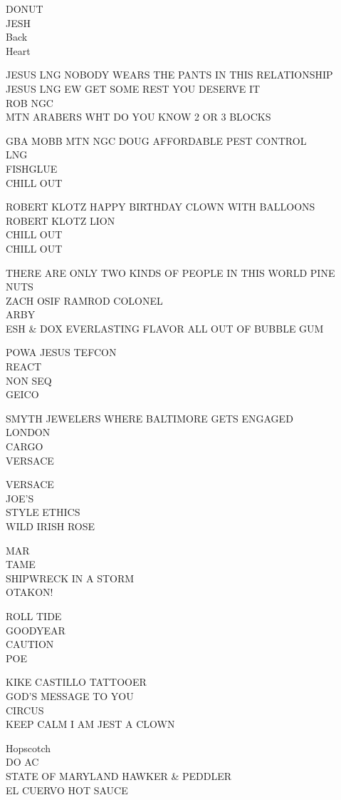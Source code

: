 \documentclass[10pt,letterpaper]{article}
\begin{document}
DONUT\\
JESH\\
Back\\
Heart

JESUS LNG NOBODY WEARS THE PANTS IN THIS RELATIONSHIP\\
JESUS LNG EW GET SOME REST YOU DESERVE IT\\
ROB NGC\\
MTN ARABERS WHT DO YOU KNOW 2 OR 3 BLOCKS

GBA MOBB MTN NGC DOUG AFFORDABLE PEST CONTROL\\
LNG\\
FISHGLUE\\
CHILL OUT

ROBERT KLOTZ HAPPY BIRTHDAY CLOWN WITH BALLOONS\\
ROBERT KLOTZ LION\\
CHILL OUT\\
CHILL OUT

THERE ARE ONLY TWO KINDS OF PEOPLE IN THIS WORLD PINE NUTS\\
ZACH OSIF RAMROD COLONEL\\
ARBY\\
ESH \& DOX EVERLASTING FLAVOR ALL OUT OF BUBBLE GUM

POWA JESUS TEFCON\\
REACT\\
NON SEQ\\
GEICO

SMYTH JEWELERS WHERE BALTIMORE GETS ENGAGED\\
LONDON\\
CARGO\\
VERSACE

VERSACE\\
JOE'S\\
STYLE ETHICS\\
WILD IRISH ROSE

MAR\\
TAME\\
SHIPWRECK IN A STORM\\
OTAKON!

ROLL TIDE\\
GOODYEAR\\
CAUTION\\
POE

KIKE CASTILLO TATTOOER\\
GOD'S MESSAGE TO YOU\\
CIRCUS\\
KEEP CALM I AM JEST A CLOWN

Hopscotch\\
DO AC\\
STATE OF MARYLAND HAWKER \& PEDDLER\\
EL CUERVO HOT SAUCE
\end{document}

